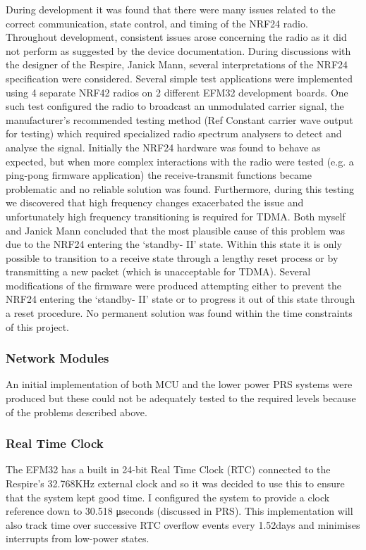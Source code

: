 During development it was found that there were many issues related to the correct
communication, state control, and timing of the NRF24 radio. Throughout development, consistent
issues arose concerning the radio as it did not perform as suggested by the device documentation.
During discussions with the designer of the Respire, Janick Mann, several interpretations of the
NRF24 specification were considered. Several simple test applications were implemented using 4
separate NRF42 radios on 2 different EFM32 development boards. One such test configured the
radio to broadcast an unmodulated carrier signal, the manufacturer’s recommended testing method
(Ref Constant carrier wave output for testing) which required specialized radio spectrum analysers
to detect and analyse the signal. Initially the NRF24 hardware was found to behave as expected, but
when more complex interactions with the radio were tested (e.g. a ping-pong firmware application)
the receive-transmit functions became problematic and no reliable solution was found.
Furthermore, during this testing we discovered that high frequency changes exacerbated the issue
and unfortunately high frequency transitioning is required for TDMA. Both myself and Janick Mann
concluded that the most plausible cause of this problem was due to the NRF24 entering the
‘standby- II’ state. Within this state it is only possible to transition to a receive state through a
lengthy reset process or by transmitting a new packet (which is unacceptable for TDMA). Several
modifications of the firmware were produced attempting either to prevent the NRF24 entering the
‘standby- II’ state or to progress it out of this state through a reset procedure. No permanent
solution was found within the time constraints of this project.


\subsubsection{Network Modules}
An initial implementation of both MCU and the lower power PRS systems were produced but these
could not be adequately tested to the required levels because of the problems described above.


\subsubsection{Real Time Clock}
The EFM32 has a built in 24-bit Real Time Clock (RTC) connected to the Respire’s 32.768KHz external
clock and so it was decided to use this to ensure that the system kept good time. I configured the
system to provide a clock reference down to 30.518 μseconds (discussed in PRS). This
implementation will also track time over successive RTC overflow events every 1.52days and
minimises interrupts from low-power states.


